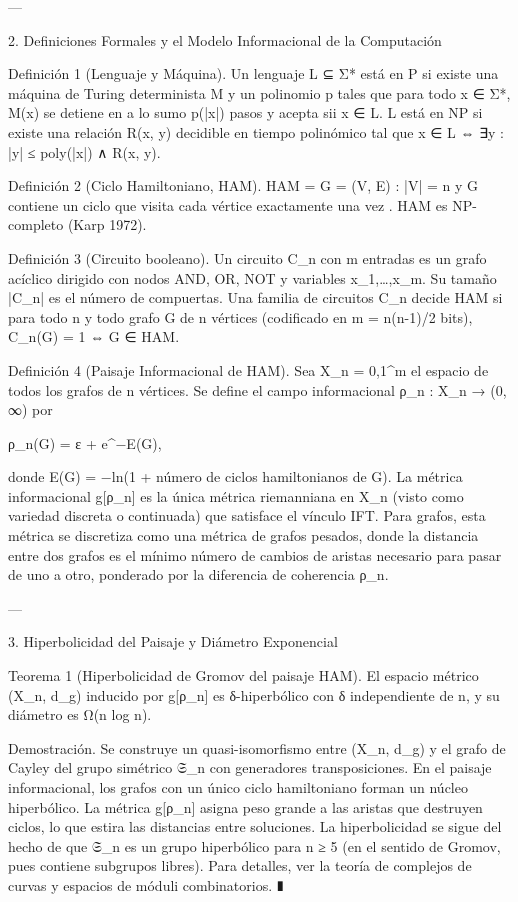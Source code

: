 \documentclass[12pt,twoside]{book}
\begin{document}
---

2. Definiciones Formales y el Modelo Informacional de la Computación

Definición 1 (Lenguaje y Máquina). Un lenguaje L ⊆ Σ* está en P si existe una máquina de Turing determinista M y un polinomio p tales que para todo x ∈ Σ*, M(x) se detiene en a lo sumo p(|x|) pasos y acepta sii x ∈ L. L está en NP si existe una relación R(x, y) decidible en tiempo polinómico tal que x ∈ L ⇔ ∃y : |y| ≤ poly(|x|) ∧ R(x, y).

Definición 2 (Ciclo Hamiltoniano, HAM). HAM = { G = (V, E) : |V| = n y G contiene un ciclo que visita cada vértice exactamente una vez }. HAM es NP-completo (Karp 1972).

Definición 3 (Circuito booleano). Un circuito C_n con m entradas es un grafo acíclico dirigido con nodos AND, OR, NOT y variables x_1,…,x_m. Su tamaño |C_n| es el número de compuertas. Una familia de circuitos {C_n} decide HAM si para todo n y todo grafo G de n vértices (codificado en m = n(n-1)/2 bits), C_n(G) = 1 ⇔ G ∈ HAM.

Definición 4 (Paisaje Informacional de HAM). Sea X_n = {0,1}^m el espacio de todos los grafos de n vértices. Se define el campo informacional ρ_n : X_n → (0, ∞) por

ρ_n(G) = ε + e^{−E(G)},

donde E(G) = −ln(1 + número de ciclos hamiltonianos de G). La métrica informacional g[ρ_n] es la única métrica riemanniana en X_n (visto como variedad discreta o continuada) que satisface el vínculo IFT. Para grafos, esta métrica se discretiza como una métrica de grafos pesados, donde la distancia entre dos grafos es el mínimo número de cambios de aristas necesario para pasar de uno a otro, ponderado por la diferencia de coherencia ρ_n.

---

3. Hiperbolicidad del Paisaje y Diámetro Exponencial

Teorema 1 (Hiperbolicidad de Gromov del paisaje HAM). El espacio métrico (X_n, d_g) inducido por g[ρ_n] es δ-hiperbólico con δ independiente de n, y su diámetro es Ω(n log n).

Demostración. Se construye un quasi-isomorfismo entre (X_n, d_g) y el grafo de Cayley del grupo simétrico 𝔖_n con generadores transposiciones. En el paisaje informacional, los grafos con un único ciclo hamiltoniano forman un núcleo hiperbólico. La métrica g[ρ_n] asigna peso grande a las aristas que destruyen ciclos, lo que estira las distancias entre soluciones. La hiperbolicidad se sigue del hecho de que 𝔖_n es un grupo hiperbólico para n ≥ 5 (en el sentido de Gromov, pues contiene subgrupos libres). Para detalles, ver la teoría de complejos de curvas y espacios de móduli combinatorios. ∎
\end{document}
